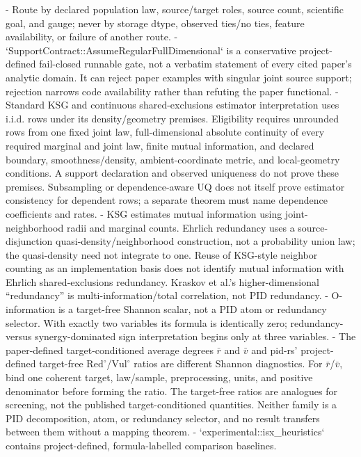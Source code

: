 \documentclass[11pt]{article}
\begin{document}
\begin{markdown}
- Route by declared population law, source/target roles, source count, scientific goal, and gauge;
  never by storage dtype, observed ties/no ties, feature availability, or failure of another route.
- `SupportContract::AssumeRegularFullDimensional` is a conservative project-defined fail-closed
  runnable gate, not a verbatim statement of every cited paper's analytic domain. It can reject
  paper examples with singular joint source support; rejection narrows code availability rather
  than refuting the paper functional.
- Standard KSG and continuous shared-exclusions estimator interpretation uses i.i.d. rows under its
  density/geometry premises. Eligibility requires unrounded rows from one fixed joint law,
  full-dimensional absolute continuity of every required marginal and joint law, finite mutual
  information, and declared boundary, smoothness/density, ambient-coordinate metric, and
  local-geometry conditions. A support declaration and observed uniqueness do not prove these
  premises. Subsampling or dependence-aware UQ does not itself prove estimator consistency for
  dependent rows; a separate theorem must name dependence coefficients and rates.
- KSG estimates mutual information using joint-neighborhood radii and marginal counts. Ehrlich
  redundancy uses a source-disjunction quasi-density/neighborhood construction, not a probability
  union law; the quasi-density need not integrate to one. Reuse of KSG-style neighbor counting as
  an implementation basis does not identify mutual information with Ehrlich shared-exclusions
  redundancy. Kraskov et al.'s higher-dimensional “redundancy” is
  multi-information/total correlation, not PID redundancy.
- O-information is a target-free Shannon scalar, not a PID atom or redundancy selector. With
  exactly two variables its formula is identically zero; redundancy- versus synergy-dominated
  sign interpretation begins only at three variables.
- The paper-defined target-conditioned average degrees $\bar r$ and $\bar v$ and pid-rs'
  project-defined target-free $\mathrm{Red}^{\circ}$/$\mathrm{Vul}^{\circ}$ ratios are different
  Shannon diagnostics. For $\bar r$/$\bar v$, bind one coherent target, law/sample,
  preprocessing, units, and positive denominator before forming the ratio. The target-free ratios
  are analogues for screening, not the published target-conditioned quantities. Neither family is
  a PID decomposition, atom, or redundancy selector, and no result transfers between them without
  a mapping theorem.
- `experimental::isx_heuristics` contains project-defined, formula-labelled comparison baselines.

\end{markdown}
\end{document}
